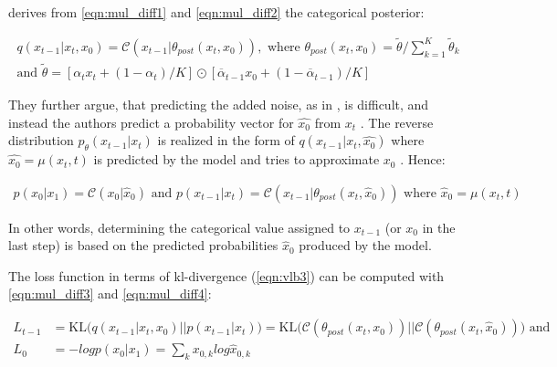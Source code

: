 \textcite{hoogeboom2021ArgmaxFlowsMultinomial} derives from \autoref{eqn:mul_diff1} and \autoref{eqn:mul_diff2} the categorical posterior:

\begin{equation}
  \begin{gathered}
  \label{eqn:mul_diff3}
  q(x_{t-1}|x_t, x_{0}) = \mathcal{C}(x_{t-1}|\theta_{post}(x_t,x_0)),\textrm{ where } \theta_{post}(x_t,x_0)=\tilde{\theta}/\sum_{k=1}^{K}\tilde{\theta}_k \\
  \textrm{and } \tilde{\theta} = \left[\alpha_tx_{t}+(1-\alpha_t)/K \right] \odot \left[\overline{\alpha}_{t-1}x_{0}+(1-\overline{\alpha}_{t-1})/K \right]
  \end{gathered}
\end{equation}

They further argue, that predicting the added noise, as in \cite{ho2020DenoisingDiffusionProbabilistic},
is difficult, and instead the authors predict a probability vector for $\hat{x_0}$ from $x_t$ \cite{hoogeboom2021ArgmaxFlowsMultinomial}.
The reverse distribution $p_\theta(x_{t-1}|x_t)$ is realized in the form of $q(x_{t-1}|x_t,\hat{x_0})$ where $\hat{x_0}=\mu(x_t, t)$ is predicted by the model and tries to approximate $x_0$ \cite{hoogeboom2021ArgmaxFlowsMultinomial}.
Hence:

\begin{equation}
  \begin{align*}
    \label{eqn:mul_diff4}
    p(x_0|x_1) = \mathcal{C}(x_0|\hat{x}_0) \textrm{ and } p(x_{t-1}|x_t) =  \mathcal{C}(x_{t-1}|\theta_{post}(x_t, \hat{x}_0)) \textrm{ where } \hat{x}_0=\mu(x_t,t)
  \end{align*}
\end{equation}

In other words, determining the categorical value assigned to $x_{t-1}$ (or $x_0$ in the last step) is based on the predicted probabilities $\hat{x}_0$ produced by the model.


The loss function in terms of \gls{kl}-divergence (\autoref{eqn:vlb3}) can be computed with \autoref{eqn:mul_diff3} and \autoref{eqn:mul_diff4}:

\begin{equation}
  \begin{align*}
    \label{eqn:mul_diff5}
    L_{t-1}&=\text{KL}\Big(q(x_{t-1}|x_t, x_0)\big\vert\big\vert p(x_{t-1}|x_t)\Big) = \text{KL}\Big(\mathcal{C}(\theta_{post}(x_t, x_0))\big\vert\big\vert \mathcal{C}(\theta_{post}(x_t, \hat{x}_0))\Big) \textrm{ and}\\
    L_{0} &= -logp(x_0|x_1) = \sum_{k}^{}x_{0,k}log\hat{x}_{0,k}
  \end{align*}
\end{equation}

